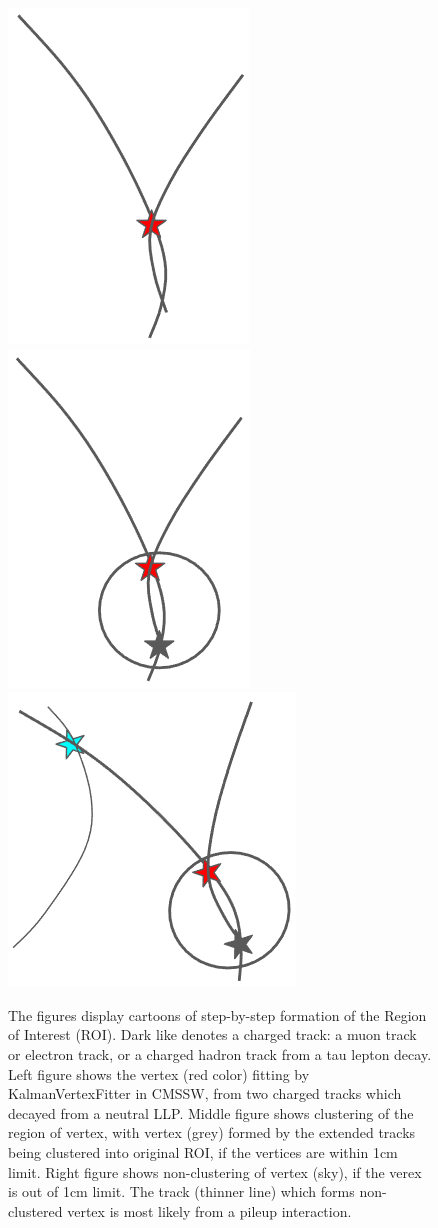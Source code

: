\begin{figure}[h!]
  \centering
  \includegraphics[width=0.27\linewidth]{figs/MLP3.png}
  \includegraphics[width=0.27\linewidth]{figs/MLP2.png}
  \includegraphics[width=0.27\linewidth]{figs/MLP1.png}
\caption{The figures display cartoons of step-by-step formation of the Region of Interest (ROI). 
	Dark like denotes a charged track: a muon track or electron track, or a charged hadron track from a tau lepton decay. 
	Left figure shows the vertex (red color) fitting by KalmanVertexFitter in CMSSW, from two charged tracks which decayed from a neutral LLP.
	Middle figure shows clustering of the region of vertex, with vertex (grey) formed by the extended tracks being clustered into original ROI, if the vertices are within 1cm limit.
	Right figure shows non-clustering of vertex (sky), if the verex is out of 1cm limit. The track (thinner line) which forms non-clustered vertex is most likely from a pileup interaction.
	}
  \label{fig:Clustering}
\end{figure}

